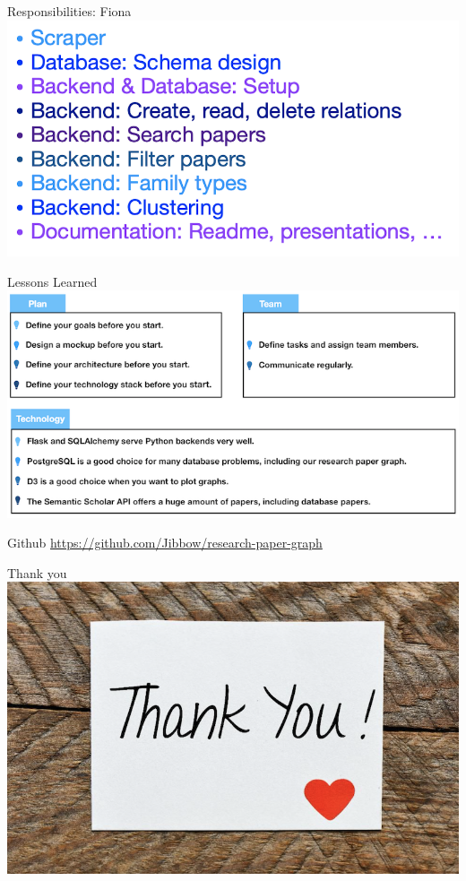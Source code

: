 \documentclass{beamer}
\begin{document}
\begin{frame}{Responsibilities: Fiona}
    \includegraphics{img_24.png}
\end{frame}

\begin{frame}{Lessons Learned}
    \includegraphics{img_21.png}
\end{frame}

\begin{frame}{Github}
    \url{https://github.com/Jibbow/research-paper-graph}
\end{frame}

\begin{frame}{Thank you}
    \includegraphics{img_05.png}
\end{frame}
\end{document}

